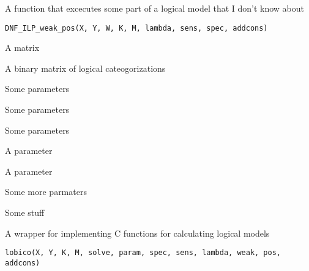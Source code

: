 \documentclass[letterpaper]{book}
\begin{document}
%
\begin{Description}\relax
A function that excecutes some part of a logical model that I don't know about
\end{Description}
%
\begin{Usage}
\begin{verbatim}
DNF_ILP_weak_pos(X, Y, W, K, M, lambda, sens, spec, addcons)
\end{verbatim}
\end{Usage}
%
\begin{Arguments}
\begin{ldescription}
\item[\code{X}] A matrix

\item[\code{Y}] A binary matrix of logical cateogorizations

\item[\code{W}] Some parameters

\item[\code{K}] Some parameters

\item[\code{M}] Some parameters

\item[\code{lambda}] A parameter

\item[\code{sens}] A parameter

\item[\code{spec}] Some more parmaters

\item[\code{addcons}] Some stuff
\end{ldescription}
\end{Arguments}
%
\begin{Description}\relax
A wrapper for implementing C functions for calculating logical models
\end{Description}
%
\begin{Usage}
\begin{verbatim}
lobico(X, Y, K, M, solve, param, spec, sens, lambda, weak, pos, addcons)
\end{verbatim}
\end{Usage}
%
\end{document}
